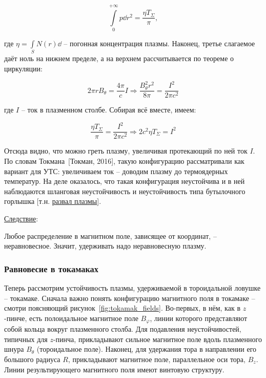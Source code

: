 \documentclass[10pt, a4paper]{article}
\newcommand{\Tokman}{~[Токман, 2016]}
\begin{document}
\begin{equation*}
	\int\limits_0^{+\infty}p\dd r^2 = \frac{\eta T_\Sigma}{\pi},
\end{equation*}

где $\eta = \int\limits_SN(r)\dd$ -- погонная концентрация плазмы.
Наконец, третье слагаемое даёт ноль на нижнем пределе, а на верхнем рассчитывается по теореме о циркуляции:

\begin{equation*}
	2\pi r B_\theta = \frac{4\pi}{c}I \Rightarrow \frac{B_\theta^2r^2}{8\pi} = \frac{I^2}{2\pi c^2}
\end{equation*}

где $I$ -- ток в плазменном столбе. Собирая всё вместе, имеем:

\begin{equation*}
	\frac{\eta T_\Sigma}{\pi} = \frac{I^2}{2\pi c^2} \Rightarrow 2c^2 \eta T_\Sigma = I^2
\end{equation*}

Отсюда видно, что можно греть плазму, увеличивая протекающий по ней ток $I$. По словам Токмана\Tokman, такую конфигурацию рассматривали как вариант для УТС: увеличиваем ток -- доводим плазму до термоядерных температур. На деле оказалось, что такая конфигурация неустойчива и в ней наблюдаются шланговая неустойчивость и неустойчивость типа бутылочного горлышка [т.н. \uline{развал плазмы}].

\uline{Следствие}:

Любое распределение в магнитном поле, зависящее от координат, -- неравновесное. Значит, удерживать надо неравновесную плазму.

\subsubsection{Равновесие в токамаках}

Теперь рассмотрим устойчивость плазмы, удерживаемой в тороидальной ловушке -- токамаке. Сначала важно понять конфигурацию магнитного поля в токамаке -- смотри поясняющий рисунок~\ref{fig:tokamak_fields}. Во-первых, в нём, как в $z$-пинче, есть полоидальное магнитное поле $B_\varphi$, линии которого представляют собой кольца вокруг плазменного столба. Для подавления неустойчивостей, типичных для $z$-пинча, прикладывают сильное магнитное поле вдоль плазменного шнура $B_\theta$ (тороидальное поле). Наконец, для удержания тора в направлении его большого радиуса $R$, прикладывают магнитное поле, параллельное оси тора, $B_z$. Линии результирующего магнитного поля имеют винтовую структуру.
\end{document}
